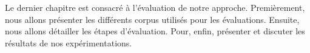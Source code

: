 \documentclass[a4paper,12pt,oneside]{../use/ESIthesis}
\begin{document}
Le dernier chapitre est consacré à l'évaluation de notre approche.
Premièrement, nous allons présenter les différents corpus utilisés pour les évaluations. 
Ensuite, nous allons détailler les étapes d'évaluation. 
Pour, enfin, présenter et discuter les résultats de nos expérimentations. 

\ifx\wholebook\relax\else
% 
% 
 
\end{document}
